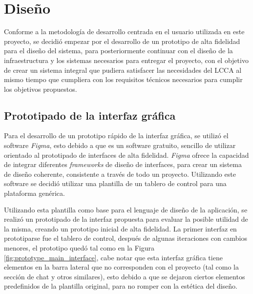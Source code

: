 \section{Diseño}

Conforme a la metodología de desarrollo centrada en el usuario utilizada en este proyecto, se decidió empezar por el desarrollo de un prototipo de alta fidelidad para el diseño del sistema, para posteriormente continuar con el diseño de la infraestructura y los sistemas necesarios para entregar el proyecto, con el objetivo de crear un sistema integral que pudiera satisfacer las necesidades del LCCA al mismo tiempo que cumpliera con los requisitos técnicos necesarios para cumplir los objetivos propuestos.

\subsection{Prototipado de la interfaz gráfica}

Para el desarrollo de un prototipo rápido de la interfaz gráfica, se utilizó el software \textit{Figma}, esto debido a que es un software gratuito, sencillo de utilizar orientado al prototipado de interfaces de alta fidelidad. \textit{Figma} ofrece la capacidad de integrar diferentes \textit{frameworks} de diseño de interfaces, para crear un sistema de diseño coherente, consistente a través de todo un proyecto. Utilizando este software se decidió utilizar una plantilla de un tablero de control para una plataforma genérica.

Utilizando esta plantilla como base para el lenguaje de diseño de la aplicación, se realizó un prototipado de la interfaz propuesta para evaluar la posible utilidad de la misma, creando un prototipo inicial de alta fidelidad. La primer interfaz en prototiparse fue el tablero de control, después de algunas iteraciones con cambios menores, el prototipo quedó tal como en la Figura \ref{fig:prototype_main_interface}, cabe notar que esta interfaz gráfica tiene elementos en la barra lateral que no corresponden con el proyecto (tal como la sección de chat y otros similares), esto debido a que se dejaron ciertos elementos predefinidos de la plantilla original, para no romper con la estética del diseño.

